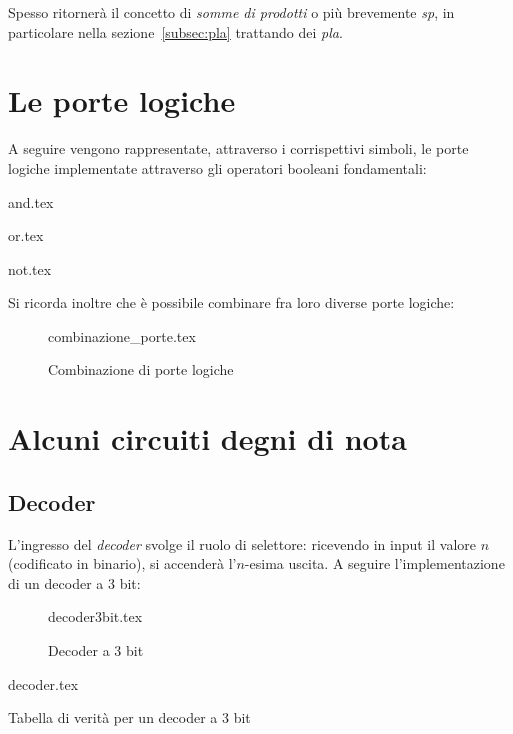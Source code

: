 \documentclass[class=book, crop=false, oneside]{standalone}
\begin{document}
Spesso ritornerà il concetto di \emph{somme di prodotti} o più brevemente \emph{sp}, in particolare nella sezione~\ref{subsec:pla} trattando dei \emph{pla}.

\section{Le porte logiche}
A seguire vengono rappresentate, attraverso i corrispettivi simboli, le porte logiche implementate attraverso gli operatori booleani fondamentali:
\vspace{10px}

\begin{minipage}[c]{.3\textwidth}
	\centering
	{and.tex}
\end{minipage}
\begin{minipage}[c]{.3\textwidth}
	\centering
	{or.tex}
\end{minipage}
\begin{minipage}[c]{.3\textwidth}
	\centering
	{not.tex}
\end{minipage}

\vspace{10px}

Si ricorda inoltre che è possibile combinare fra loro diverse porte logiche:
\begin{figure}[H]
	\centering
	{combinazione_porte.tex}
	\caption{Combinazione di porte logiche}
\end{figure}

\section{Alcuni circuiti degni di nota}
\subsection*{Decoder}
L'ingresso del \emph{decoder} svolge il ruolo di selettore: ricevendo in input il valore \(n\) (codificato in binario), si accenderà l'\(n\)-esima uscita. A seguire l'implementazione di un decoder a 3 bit:
\begin{figure}[H]
	\centering
	{decoder3bit.tex}
	\caption{Decoder a 3 bit}
\end{figure}
\begin{table}[H]
	\centering
	{decoder.tex}
	\caption{Tabella di verità per un decoder a 3 bit}
	\label{decoder-3bit}
\end{table}
\end{document}
